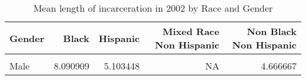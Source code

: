 \begin{table}[H]

\caption{\label{tab:tab:summarystats}Mean length of incarceration in 2002 by Race and Gender}
\centering
\begin{tabular}[t]{lrrrr}
\toprule
Gender & Black & Hispanic & Mixed Race Non Hispanic & Non Black Non Hispanic\\
\midrule
\cellcolor{gray!6}{Female} & \cellcolor{gray!6}{2.666667} & \cellcolor{gray!6}{4.500000} & \cellcolor{gray!6}{6} & \cellcolor{gray!6}{3.230769}\\
Male & 8.090909 & 5.103448 & NA & 4.666667\\
\bottomrule
\end{tabular}
\end{table}
